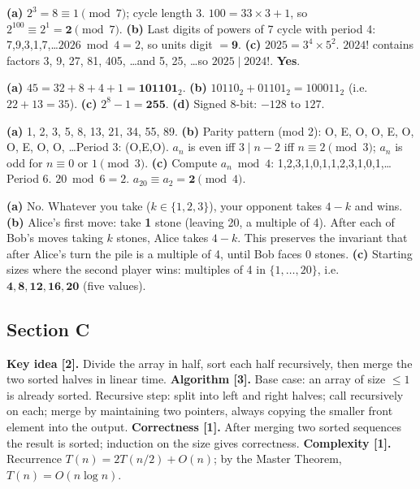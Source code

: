 \begin{solution}
\textbf{(a)} $2^3 = 8 \equiv 1 \pmod7$; cycle length 3. $100 = 33\times3+1$, so $2^{100} \equiv 2^1 = \mathbf{2} \pmod7$.
\textbf{(b)} Last digits of powers of 7 cycle with period 4: 7,9,3,1,7,\ldots $2026 \bmod 4 = 2$, so units digit $= \mathbf{9}$.
\textbf{(c)} $2025 = 3^4 \times 5^2$. $2024!$ contains factors 3, 9, 27, 81, 405, \ldots and 5, 25, \ldots so $2025 \mid 2024!$. \textbf{Yes}.
\end{solution}

\begin{solution}[12. Binary]
\textbf{(a)} $45 = 32+8+4+1 = \mathbf{101101}_2$.
\textbf{(b)} $10110_2 + 01101_2 = 100011_2$ (i.e.\ $22+13=35$).
\textbf{(c)} $2^8 - 1 = \mathbf{255}$.
\textbf{(d)} Signed 8-bit: $-128$ to $127$.
\end{solution}

\begin{solution}
\textbf{(a)} 1, 2, 3, 5, 8, 13, 21, 34, 55, 89.
\textbf{(b)} Parity pattern (mod 2): O, E, O, O, E, O, O, E, O, O, \ldots Period 3: (O,E,O). $a_n$ is even iff $3 \mid n-2$ iff $n \equiv 2 \pmod 3$; $a_n$ is odd for $n \equiv 0$ or $1 \pmod 3$.
\textbf{(c)} Compute $a_n \bmod 4$: 1,2,3,1,0,1,1,2,3,1,0,1,\ldots Period 6. $20 \bmod 6 = 2$. $a_{20} \equiv a_2 = \mathbf{2} \pmod4$.
\end{solution}

\begin{solution}
\textbf{(a)} No. Whatever you take ($k \in \{1,2,3\}$), your opponent takes $4-k$ and wins.
\textbf{(b)} Alice's first move: take \textbf{1} stone (leaving 20, a multiple of 4). After each of Bob's moves taking $k$ stones, Alice takes $4-k$. This preserves the invariant that after Alice's turn the pile is a multiple of 4, until Bob faces 0 stones.
\textbf{(c)} Starting sizes where the second player wins: multiples of 4 in $\{1,\ldots,20\}$, i.e.\ $\mathbf{4, 8, 12, 16, 20}$ (five values).
\end{solution}

\subsection*{Section C}

\begin{solution}
\textbf{Key idea [2].} Divide the array in half, sort each half recursively, then merge the two sorted halves in linear time.
\textbf{Algorithm [3].} Base case: an array of size $\le 1$ is already sorted. Recursive step: split into left and right halves; call recursively on each; merge by maintaining two pointers, always copying the smaller front element into the output.
\textbf{Correctness [1].} After merging two sorted sequences the result is sorted; induction on the size gives correctness.
\textbf{Complexity [1].} Recurrence $T(n)=2T(n/2)+O(n)$; by the Master Theorem, $T(n) = O(n \log n)$.
\end{solution}

